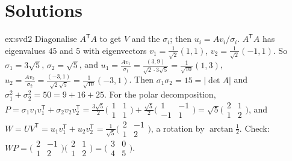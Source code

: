 \section{Solutions}

\begin{solution}{ex:svd2}
\idea Diagonalise $A^{\mathsf T}A$ to get $V$ and the $\sigma_i$; then $u_i=Av_i/\sigma_i$.
\writeup $A^{\mathsf T}A$ has eigenvalues $45$ and $5$ with eigenvectors $v_1=\frac1{\sqrt2}(1,1)$, $v_2=\frac1{\sqrt2}(-1,1)$.
So $\sigma_1=3\sqrt5$, $\sigma_2=\sqrt5$, and $u_1=\frac{Av_1}{\sigma_1}=\frac{(3,9)}{\sqrt2\cdot3\sqrt5}=\frac1{\sqrt{10}}(1,3)$,
$u_2=\frac{Av_2}{\sigma_2}=\frac{(-3,1)}{\sqrt2\sqrt5}=\frac1{\sqrt{10}}(-3,1)$. Then $\sigma_1\sigma_2=15=|\det A|$ and
$\sigma_1^2+\sigma_2^2=50=9+16+25$. For the polar decomposition, $P=\sigma_1v_1v_1^{\mathsf T}+\sigma_2v_2v_2^{\mathsf T}
=\frac{3\sqrt5}2\bigl(\begin{smallmatrix}1&1\\1&1\end{smallmatrix}\bigr)+\frac{\sqrt5}2\bigl(\begin{smallmatrix}1&-1\\-1&1\end{smallmatrix}\bigr)
=\sqrt5\bigl(\begin{smallmatrix}2&1\\1&2\end{smallmatrix}\bigr)$, and
$W=UV^{\mathsf T}=u_1v_1^{\mathsf T}+u_2v_2^{\mathsf T}=\frac1{\sqrt5}\bigl(\begin{smallmatrix}2&-1\\1&2\end{smallmatrix}\bigr)$, a
rotation by $\arctan\frac12$. Check: $WP=\bigl(\begin{smallmatrix}2&-1\\1&2\end{smallmatrix}\bigr)\bigl(\begin{smallmatrix}2&1\\1&2
\end{smallmatrix}\bigr)=\bigl(\begin{smallmatrix}3&0\\4&5\end{smallmatrix}\bigr)$.
\end{solution}

